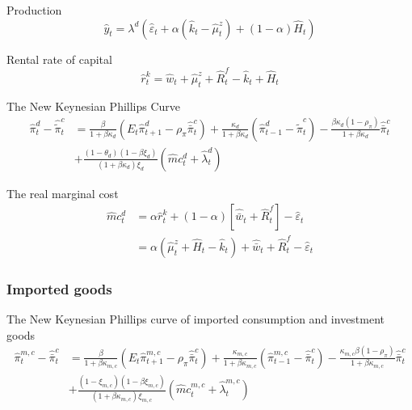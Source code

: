 \documentclass[12pt,oneside,a4paper]{article}
\begin{document}
Production
\begin{equation}
    \hat{y}_{t}=\lambda^{d}\left(\hat{\varepsilon}_{t}+\alpha\left(\hat{k}_{t}-\hat{\mu}_{t}^{z}\right)+(1-\alpha) \hat{H}_{t}\right)
\end{equation}

Rental rate of capital
\begin{equation}
    \hat{r}_{t}^{k}=\hat{w}_{t}+\hat{\mu}_{t}^{z} + \hat{R}_t^{f}-\hat{k}_{t}+\hat{H}_{t}
\end{equation}

The New Keynesian Phillips Curve
\begin{equation}
     \begin{aligned}
    \hat{\pi}_{t}^{d}-\hat{\tilde{\pi}}_{t}^{c} &=\frac{\beta}{1+\beta \kappa_{d}}\left(E_{t} \hat{\pi}_{t+1}^{d}-\rho_{\pi} \hat{\bar{\pi}}_{t}^{c}\right)+\frac{\kappa_{d}}{1+\beta \kappa_{d}}\left(\hat{\pi}_{t-1}^{d}-\hat{\tilde{\pi}}_{t}^{c}\right)-\frac{\beta \kappa_{d}\left(1-\rho_{\pi}\right)}{1+\beta \kappa_{d}} \hat{\bar{\pi}}_{t}^{c} \\
    &+\frac{\left(1-\theta_{d}\right)\left(1-\beta \xi_{d}\right)}{\left(1+\beta \kappa_{d}\right) \xi_{d}}\left(\hat{m} c_{t}^{d}+\hat{\lambda}_{t}^{d}\right)
    \end{aligned} 
\end{equation}

The real marginal cost
\begin{equation}
\begin{aligned}
\hat{m} c_{t}^{d} &=\alpha \hat{r}_{t}^{k}+(1-\alpha)\left[\widehat{\bar{w}}_{t}+\hat{R}_{t}^{f}\right]-\hat{\varepsilon}_{t} \\
&=\alpha\left(\hat{\mu}_{t}^{z}+\hat{H}_{t}-\hat{k}_{t}\right)+\widehat{\bar{w}}_{t}+\hat{R}_{t}^{f}-\hat{\varepsilon}_{t}
\end{aligned}
\end{equation}

\subsubsection*{Imported goods}

The New Keynesian Phillips curve of imported consumption and investment goods
\begin{equation}
    \begin{aligned}
    \hat{\pi}_{t}^{m, c}-\hat{\bar{\pi}}_{t}^{c} &=\frac{\beta}{1+\beta \kappa_{m, c}}\left(E_{t} \hat{\pi}_{t+1}^{m, c}-\rho_{\pi} \hat{\bar{\pi}}_{t}^{c}\right)+\frac{\kappa_{m, c}}{1+\beta \kappa_{m, c}}\left(\hat{\pi}_{t-1}^{m, c}-\hat{\bar{\pi}}_{t}^{c}\right)-\frac{\kappa_{m, c} \beta\left(1-\rho_{\pi}\right)}{1+\beta \kappa_{m, c}} \hat{\bar{\pi}}_{t}^{c} \\
    &+\frac{\left(1-\xi_{m, c}\right)\left(1-\beta \xi_{m, c}\right)}{\left(1+\beta \kappa_{m, c}\right) \xi_{m, c}}\left(\hat{m} c_{t}^{m, c}+\hat{\lambda}_{t}^{m, c}\right)
    \end{aligned}
\end{equation}
\end{document}
